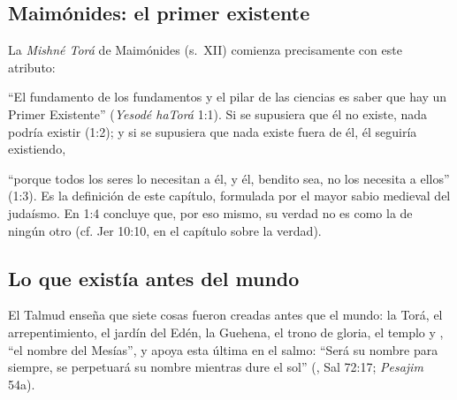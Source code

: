
\subsection{Maimónides: el primer existente}
La \emph{Mishné Torá} de Maimónides (s.~XII) comienza precisamente con este atributo:


``El fundamento de los fundamentos y el pilar de las ciencias es saber que hay un Primer Existente'' (\emph{Yesodé haTorá} 1:1). Si se supusiera que él no existe, nada podría existir (1:2); y si se supusiera que nada existe fuera de él, él seguiría existiendo,


``porque todos los seres lo necesitan a él, y él, bendito sea, no los necesita a ellos'' (1:3). Es la definición de este capítulo, formulada por el mayor sabio medieval del judaísmo. En 1:4 concluye que, por eso mismo, su verdad no es como la de ningún otro (cf. Jer 10:10, en el capítulo sobre la verdad).

\subsection{Lo que existía antes del mundo}
El Talmud enseña que siete cosas fueron creadas antes que el mundo: la Torá, el arrepentimiento, el jardín del Edén, la Guehena, el trono de gloria, el templo y , ``el nombre del Mesías'', y apoya esta última en el salmo: ``Será su nombre para siempre, se perpetuará su nombre mientras dure el sol'' (, Sal 72:17; \emph{Pesajim} 54a).


